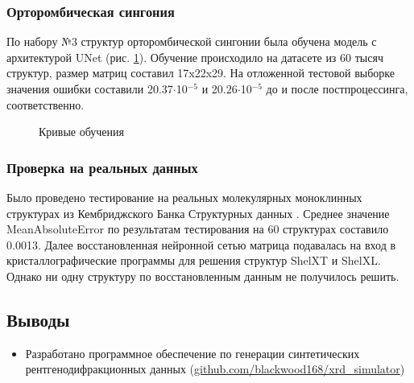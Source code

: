 \documentclass[a4paper,12pt]{article}
\begin{document}
{\subsubsection*{Орторомбическая сингония}

По набору №3 структур орторомбической сингонии была обучена модель с архитектурой UNet (рис. \ref{ROMB}). Обучение происходило на датасете из 60 тысяч структур, размер матриц составил 17x22x29. На отложенной тестовой выборке значения ошибки составили 20.37$\cdot$10$^{-5}$ и 20.26$\cdot$10$^{-5}$ до и после постпроцессинга, соответственно.

\begin{figure}[H]
	\caption{Кривые обучения}
	\label{ROMB}
\end{figure}

\subsubsection*{Проверка на реальных данных}

Было проведено тестирование на реальных молекулярных моноклинных структурах из Кембриджского Банка Структурных данных \cite{csd}. Среднее значение MeanAbsoluteError по результатам тестирования на 60 структурах составило 0.0013. Далее восстановленная нейронной сетью матрица подавалась на вход в кристаллографические программы для решения структур ShelXT и ShelXL. Однако ни одну структуру по восстановленным данным не получилось решить. 


\subsection*{Выводы}

\begin{itemize}
\item Разработано программное обеспечение по генерации синтетических рентгенодифракционных данных (\url{github.com/blackwood168/xrd_simulator})


\end{itemize}}
\end{document}

